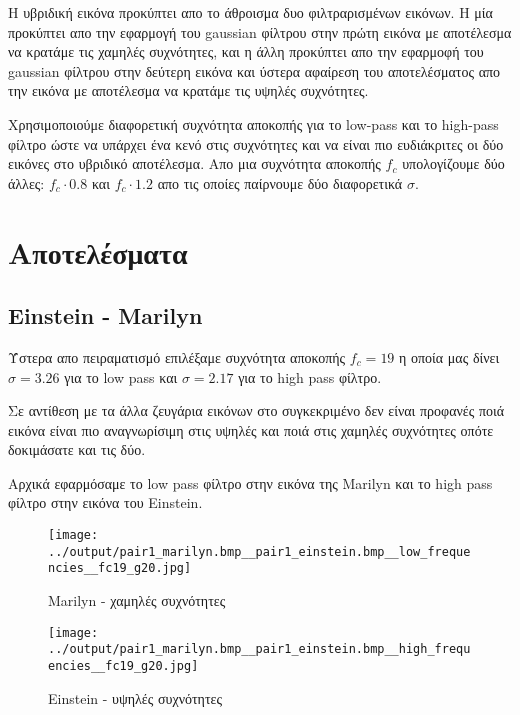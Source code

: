 \documentclass[11pt]{scrartcl} %
\begin{document}
Η υβριδική εικόνα προκύπτει απο το άθροισμα δυο φιλτραρισμένων εικόνων. Η μία προκύπτει απο την εφαρμογή του gaussian φίλτρου στην πρώτη εικόνα με αποτέλεσμα να κρατάμε τις χαμηλές συχνότητες, και η άλλη προκύπτει απο την εφαρμοφή του gaussian φίλτρου στην δεύτερη εικόνα και ύστερα αφαίρεση του αποτελέσματος απο την εικόνα με αποτέλεσμα να κρατάμε τις υψηλές συχνότητες.

Χρησιμοποιούμε διαφορετική συχνότητα αποκοπής για το low-pass και το high-pass φίλτρο ώστε να υπάρχει ένα κενό στις συχνότητες και να είναι πιο ευδιάκριτες οι δύο εικόνες στο υβριδικό αποτέλεσμα. Απο μια συχνότητα αποκοπής $f_c$ υπολογίζουμε δύο άλλες: $f_c \cdot 0.8$ και $f_c \cdot 1.2$ απο τις οποίες παίρνουμε δύο διαφορετικά $\sigma$.


\section{Αποτελέσματα}

\subsection{Einstein - Marilyn}

Ύστερα απο πειραματισμό επιλέξαμε συχνότητα αποκοπής $f_c = 19$ η οποία μας δίνει $\sigma = 3.26$ για το low pass και $\sigma = 2.17$ για το high pass φίλτρο.

Σε αντίθεση με τα άλλα ζευγάρια εικόνων στο συγκεκριμένο δεν είναι προφανές ποιά εικόνα είναι πιο αναγνωρίσιμη στις υψηλές και ποιά στις χαμηλές συχνότητες οπότε δοκιμάσατε και τις δύο.

Αρχικά εφαρμόσαμε το low pass φίλτρο στην εικόνα της Marilyn και το high pass φίλτρο στην εικόνα του Einstein.

\begin{figure}[H]
  \begin{minipage}[c]{8cm}
    \texttt{[image: ../output/pair1\_marilyn.bmp\_\_pair1\_einstein.bmp\_\_low\_frequencies\_\_fc19\_g20.jpg]}
    \caption{Marilyn - χαμηλές συχνότητες}
  \end{minipage}
  \begin{minipage}[c]{8cm}
    \texttt{[image: ../output/pair1\_marilyn.bmp\_\_pair1\_einstein.bmp\_\_high\_frequencies\_\_fc19\_g20.jpg]}
    \caption{Einstein - υψηλές συχνότητες}
  \end{minipage}
\end{figure}
\end{document}
